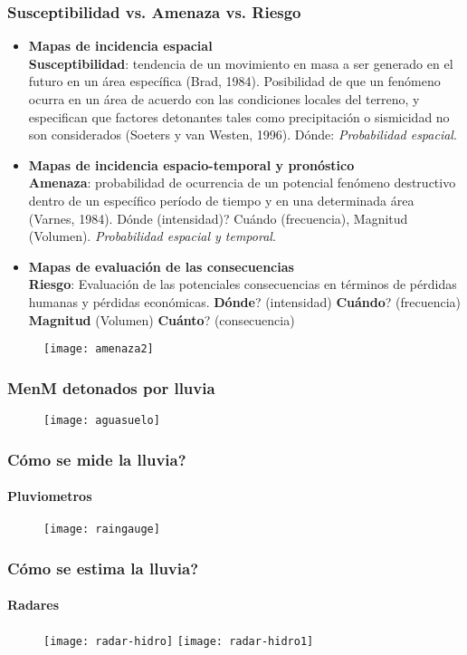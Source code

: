\documentclass[12pt]{beamer}
\begin{document}
\begin{frame}
\frametitle{Susceptibilidad vs. Amenaza vs. Riesgo}
\scriptsize{
\begin{itemize}
\item \textbf{Mapas de incidencia espacial}\\
\textbf{Susceptibilidad}: tendencia de un movimiento en masa a ser generado en el futuro en un área específica (Brad, 1984). Posibilidad de que un fenómeno ocurra en un área de acuerdo con las condiciones locales del terreno, y especifican que factores detonantes tales como precipitación o sismicidad no son considerados (Soeters y van Westen, 1996).  Dónde: \emph{Probabilidad espacial}.
\item \textbf{Mapas de incidencia espacio-temporal y pronóstico}\\
\textbf{Amenaza}: probabilidad de ocurrencia de un potencial fenómeno destructivo dentro de un específico período de tiempo y en una determinada área (Varnes, 1984). Dónde (intensidad)? Cuándo (frecuencia), Magnitud (Volumen). \emph{Probabilidad espacial y temporal}.
\item \textbf{Mapas de evaluación de las consecuencias}\\
\textbf{Riesgo}: Evaluación de las potenciales consecuencias en términos de pérdidas humanas y pérdidas económicas. \textbf{Dónde}? (intensidad) \textbf{Cuándo}? (frecuencia) \textbf{Magnitud} (Volumen) \textbf{Cuánto}? (consecuencia)
\end{itemize}
}
\begin{figure}
\centering
\texttt{[image: amenaza2]} 
\end{figure}
\end{frame}
\begin{frame}
\frametitle{MenM detonados por lluvia}
\begin{figure}
\centering
\texttt{[image: aguasuelo]} 
\end{figure}
\end{frame}
\begin{frame}
\frametitle{Cómo se mide la lluvia?}
\framesubtitle{Pluviometros}
\begin{figure}
\centering
\texttt{[image: raingauge]} 
\end{figure}
\end{frame}
\begin{frame}
\frametitle{Cómo se estima la lluvia?}
\framesubtitle{Radares}
\begin{figure}
\centering
\texttt{[image: radar-hidro]} 
\texttt{[image: radar-hidro1]} 
\end{figure}
\end{frame}
\end{document}
